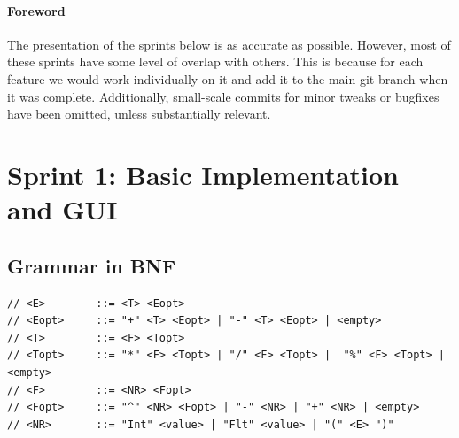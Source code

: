 \documentclass[a4paper, oneside, 11pt]{report}
\begin{document}





\paragraph{Foreword} The presentation of the sprints below is as accurate as possible. However, most of these sprints have some level of overlap with others. This is because for each feature we would work individually on it and add it to the main git branch when it was complete. Additionally, small-scale commits for minor tweaks or bugfixes have been omitted, unless substantially relevant.  


\section{Sprint 1: Basic Implementation and GUI}
\subsection{Grammar in BNF}
\begin{verbatim}
// <E>        ::= <T> <Eopt>
// <Eopt>     ::= "+" <T> <Eopt> | "-" <T> <Eopt> | <empty>
// <T>        ::= <F> <Topt>
// <Topt>     ::= "*" <F> <Topt> | "/" <F> <Topt> |  "%" <F> <Topt> |<empty>
// <F>        ::= <NR> <Fopt>
// <Fopt>     ::= "^" <NR> <Fopt> | "-" <NR> | "+" <NR> | <empty> 
// <NR>       ::= "Int" <value> | "Flt" <value> | "(" <E> ")"
\end{verbatim}
\end{document}

